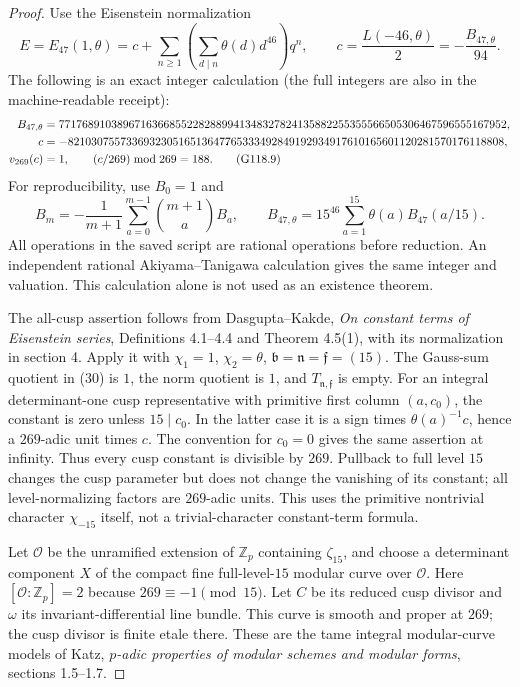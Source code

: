 \begin{proof}
Use the Eisenstein normalization
\[
 E=E_{47}(1,\theta)
  =c+\sum_{n\ge1}\left(\sum_{d\mid n}\theta(d)d^{46}\right)q^n,
 \qquad c=\frac{L(-46,\theta)}2=-\frac{B_{47,\theta}}{94}.
                                                        \tag{G118.8}
\]
The following is an exact integer calculation (the full integers are also
in the machine-readable receipt):
{\small\begin{align}
 B_{47,\theta}
 &=77176891038967163668552282889941348327824135882255355566505306467596555167952,\notag\\
 c
 &=-821030755733693230516513647765333492849192934917610165601120281570176118808,\notag\\
 v_{269}(c)&=1,\qquad (c/269)\bmod269=188. \tag{G118.9}
\end{align}}
For reproducibility, use $B_0=1$ and
\[
 B_m=-\frac1{m+1}\sum_{a=0}^{m-1}\binom{m+1}{a}B_a,
 \qquad
 B_{47,\theta}=15^{46}\sum_{a=1}^{15}\theta(a)B_{47}(a/15).
                                                        \tag{G118.10}
\]
All operations in the saved script are rational operations before reduction.
An independent rational Akiyama--Tanigawa calculation gives the same integer
and valuation.  This calculation alone is not used as an existence theorem.

The all-cusp assertion follows from Dasgupta--Kakde,
\emph{On constant terms of Eisenstein series}, Definitions 4.1--4.4 and
Theorem 4.5(1), with its normalization in section 4.  Apply it with
$\chi_1=1$, $\chi_2=\theta$, $\mathfrak b=\mathfrak n=\mathfrak f=(15)$.
The Gauss-sum quotient in (30) is $1$, the norm quotient is $1$, and
$T_{\mathfrak n,\mathfrak f}$ is empty.  For an integral determinant-one
cusp representative with primitive first column $(a,c_0)$, the constant is
zero unless $15\mid c_0$.  In the latter case it is a sign times
$\theta(a)^{-1}c$, hence a $269$-adic unit times $c$.
The convention for $c_0=0$ gives the same assertion at infinity.
Thus every cusp constant is divisible by $269$.
Pullback to full level $15$ changes the cusp parameter but does not change
the vanishing of its constant; all level-normalizing factors are $269$-adic
units.  This uses the primitive nontrivial character $\chi_{-15}$ itself,
not a trivial-character constant-term formula.

Let $\mathcal O$ be the unramified extension of $\mathbb Z_p$ containing
$\zeta_{15}$, and choose a determinant component $X$ of the compact fine
full-level-$15$ modular curve over $\mathcal O$.
Here $[\mathcal O:\mathbb Z_p]=2$ because $269\equiv-1\pmod {15}$.
Let $C$ be its reduced cusp divisor and $\omega$ its invariant-differential
line bundle.  This curve is smooth and proper at $269$; the cusp divisor is
finite etale there.  These are the tame integral modular-curve models of
Katz, \emph{$p$-adic properties of modular schemes and modular forms},
sections 1.5--1.7.


\end{proof}
